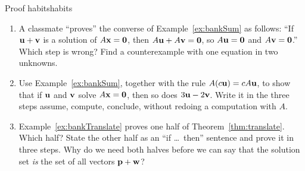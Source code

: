 \documentclass[11pt]{article}
\begin{document}
\begin{think}{Proof habits}{habits}
\begin{enumerate}[label=(\arabic*)]
  \item A classmate ``proves'' the converse of Example~\ref{ex:bankSum} as follows: ``If $\mathbf{u}+\mathbf{v}$ is a solution of $A\mathbf{x}=\mathbf{0}$, then $A\mathbf{u}+A\mathbf{v}=\mathbf{0}$, so $A\mathbf{u}=\mathbf{0}$ and $A\mathbf{v}=\mathbf{0}$.'' Which step is wrong? Find a counterexample with one equation in two unknowns.
  \item Use Example~\ref{ex:bankSum}, together with the rule $A(c\mathbf{u})=cA\mathbf{u}$, to show that if $\mathbf{u}$ and $\mathbf{v}$ solve $A\mathbf{x}=\mathbf{0}$, then so does $3\mathbf{u}-2\mathbf{v}$. Write it in the three steps assume, compute, conclude, without redoing a computation with $A$.
  \item Example~\ref{ex:bankTranslate} proves one half of Theorem~\ref{thm:translate}. Which half? State the other half as an ``if \dots\ then'' sentence and prove it in three steps. Why do we need both halves before we can say that the solution set \emph{is} the set of all vectors $\mathbf{p}+\mathbf{w}$?
\end{enumerate}
\end{think}
\end{document}
